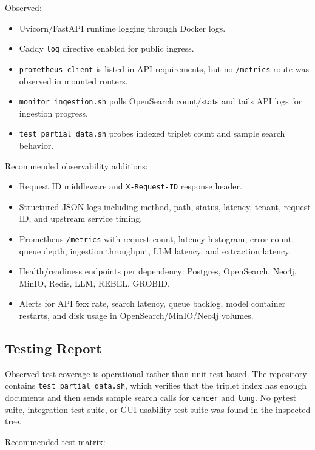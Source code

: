 \documentclass[10pt,letterpaper]{article}
\begin{document}
Observed:

\begin{itemize}
\item Uvicorn/FastAPI runtime logging through Docker logs.
\item Caddy \texttt{log} directive enabled for public ingress.
\item \texttt{prometheus-client} is listed in API requirements, but no \texttt{/metrics} route was observed in mounted routers.
\item \texttt{monitor\_ingestion.sh} polls OpenSearch count/stats and tails API logs for ingestion progress.
\item \texttt{test\_partial\_data.sh} probes indexed triplet count and sample search behavior.
\end{itemize}

Recommended observability additions:

\begin{itemize}
\item Request ID middleware and \texttt{X-Request-ID} response header.
\item Structured JSON logs including method, path, status, latency, tenant, request ID, and upstream service timing.
\item Prometheus \texttt{/metrics} with request count, latency histogram, error count, queue depth, ingestion throughput, LLM latency, and extraction latency.
\item Health/readiness endpoints per dependency: Postgres, OpenSearch, Neo4j, MinIO, Redis, LLM, REBEL, GROBID.
\item Alerts for API 5xx rate, search latency, queue backlog, model container restarts, and disk usage in OpenSearch/MinIO/Neo4j volumes.
\end{itemize}

\subsection{Testing Report}

Observed test coverage is operational rather than unit-test based. The repository contains \texttt{test\_partial\_data.sh}, which verifies that the triplet index has enough documents and then sends sample search calls for \texttt{cancer} and \texttt{lung}. No pytest suite, integration test suite, or GUI usability test suite was found in the inspected tree.

Recommended test matrix:
\end{document}
